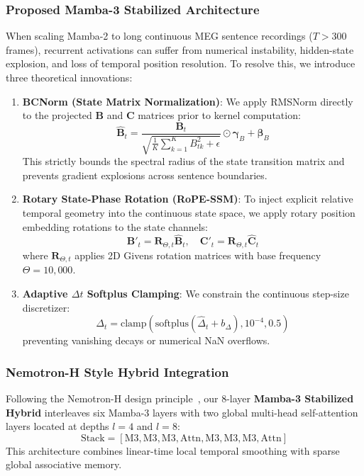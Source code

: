 \documentclass[conference]{IEEEtran}
\begin{document}
\subsubsection{Proposed Mamba-3 Stabilized Architecture}
When scaling Mamba-2 to long continuous MEG sentence recordings ($T > 300$ frames), recurrent activations can suffer from numerical instability, hidden-state explosion, and loss of temporal position resolution. To resolve this, we introduce three theoretical innovations:
\begin{enumerate}
    \item \textbf{BCNorm (State Matrix Normalization)}: We apply RMSNorm directly to the projected $\mathbf{B}$ and $\mathbf{C}$ matrices prior to kernel computation:
    \begin{equation}
        \hat{\mathbf{B}}_t = \frac{\mathbf{B}_t}{\sqrt{\frac{1}{K}\sum_{k=1}^K B_{tk}^2 + \epsilon}} \odot \boldsymbol{\gamma}_B + \boldsymbol{\beta}_B
    \end{equation}
    This strictly bounds the spectral radius of the state transition matrix and prevents gradient explosions across sentence boundaries.
    \item \textbf{Rotary State-Phase Rotation (RoPE-SSM)}: To inject explicit relative temporal geometry into the continuous state space, we apply rotary position embedding rotations to the state channels:
    \begin{equation}
        \mathbf{B}'_t = \mathbf{R}_{\Theta, t} \hat{\mathbf{B}}_t, \quad \mathbf{C}'_t = \mathbf{R}_{\Theta, t} \hat{\mathbf{C}}_t
    \end{equation}
    where $\mathbf{R}_{\Theta, t}$ applies 2D Givens rotation matrices with base frequency $\Theta = 10,000$.
    \item \textbf{Adaptive $\Delta t$ Softplus Clamping}: We constrain the continuous step-size discretizer:
    \begin{equation}
        \Delta_t = \text{clamp}\left(\text{softplus}(\hat{\Delta}_t + b_\Delta), 10^{-4}, 0.5\right)
    \end{equation}
    preventing vanishing decays or numerical NaN overflows.
\end{enumerate}

\subsubsection{Nemotron-H Style Hybrid Integration}
Following the Nemotron-H design principle~\cite{nemotron}, our 8-layer \textbf{Mamba-3 Stabilized Hybrid} interleaves six Mamba-3 layers with two global multi-head self-attention layers located at depths $l=4$ and $l=8$:
$$\text{Stack} = [\text{M3}, \text{M3}, \text{M3}, \text{Attn}, \text{M3}, \text{M3}, \text{M3}, \text{Attn}]$$
This architecture combines linear-time local temporal smoothing with sparse global associative memory.
\end{document}
